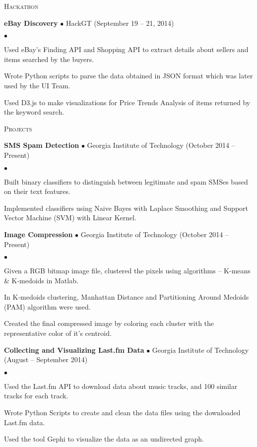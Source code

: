 \documentclass[10pt]{article}
\newcommand{\lineunder}{\\\vspace{-9pt}\hrulefill}
\newcommand{\header}[1]{{\normalsize\scshape{#1}} \lineunder}
\newcommand{\project}[3]{{ \textbf{#1} $\bullet$ #2 \hfill (#3)\\  }}
\newenvironment{achievements}{\begin{list}{$\bullet$}{\topsep 0pt \itemsep 0pt}}{\end{list}}
\begin{document}
\vspace{3pt}

\header{Hackathon}

\project{eBay Discovery}{HackGT}{September 19 -- 21, 2014}
	\begin{achievements}
	\item Used eBay's Finding API and Shopping API to extract details about sellers and items searched by the buyers.
	\item Wrote Python scripts to parse the data obtained in JSON format which was later used by the UI Team.
	\item Used D3.js to make visualizations for Price Trends Analysis of items returned by the keyword search.
	\end{achievements}	
	
\vspace{3pt}

\header{Projects}

\project{SMS Spam Detection}{Georgia Institute of Technology}{October 2014 -- Present}
	\begin{achievements}
	\item Built binary classifiers to distinguish between legitimate and spam SMSes based on their text features.
	\item Implemented classifiers using Naive Bayes with Laplace Smoothing and Support Vector Machine (SVM) with Linear Kernel.
	\end{achievements}	

\project{Image Compression}{Georgia Institute of Technology}{October 2014 -- Present}
	\begin{achievements}
	\item Given a RGB bitmap image file, clustered the pixels using algorithms -- K-means \& K-medoids in Matlab.
	\item In K-medoids clustering, Manhattan Distance and Partitioning Around Medoids (PAM) algorithm were used.
	\item Created the final compressed image by coloring each cluster with the representative color of it's centroid.
	\end{achievements}	

\project{Collecting and Visualizing Last.fm Data}{Georgia Institute of Technology}{August -- September 2014}
	\begin{achievements}
	\item Used the Last.fm API to download data about music tracks, and 100 similar tracks for each track.
	\item Wrote Python Scripts to create and clean the data files using the downloaded Last.fm data.
	\item Used the tool Gephi to visualize the data as an undirected graph.
	\end{achievements}	
\end{document}
